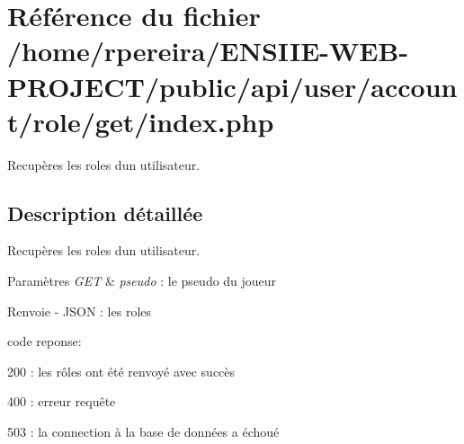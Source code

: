 \hypertarget{user_2account_2role_2get_2index_8php}{}\section{Référence du fichier /home/rpereira/\+E\+N\+S\+I\+I\+E-\/\+W\+E\+B-\/\+P\+R\+O\+J\+E\+C\+T/public/api/user/account/role/get/index.php}
\label{user_2account_2role_2get_2index_8php}


Recupères les roles d\textquotesingle{}un utilisateur.  




\subsection{Description détaillée}
Recupères les roles d\textquotesingle{}un utilisateur. 


\begin{DoxyParams}{Paramètres}
{\em G\+ET} & {\itshape pseudo} \+: le pseudo du joueur \\
\hline
\end{DoxyParams}
\begin{DoxyReturn}{Renvoie}
-\/ J\+S\+ON \+: les roles
\begin{DoxyItemize}
\item code reponse\+:
\item 200 \+: les rôles ont été renvoyé avec succès
\item 400 \+: erreur requête
\item 503 \+: la connection à la base de données a échoué 
\end{DoxyItemize}
\end{DoxyReturn}
